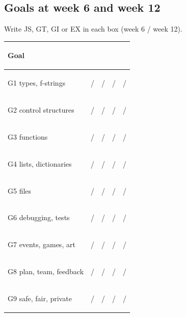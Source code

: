 \documentclass[level=2]{kidscode}
\begin{document}
\subsection{Goals at week 6 and week 12}
Write JS, GT, GI or EX in each box (week 6 / week 12).

{\small
\renewcommand{\arraystretch}{1.35}
\begin{tabularx}{\linewidth}{@{}>{\bfseries\raggedright\arraybackslash}p{4.6cm}*{4}{|X}@{}}
\toprule
Goal & & & & \\ \midrule
G1 types, f-strings & \quad / & \quad / & \quad / & \quad / \\ \midrule
G2 control structures & \quad / & \quad / & \quad / & \quad / \\ \midrule
G3 functions & \quad / & \quad / & \quad / & \quad / \\ \midrule
G4 lists, dictionaries & \quad / & \quad / & \quad / & \quad / \\ \midrule
G5 files & \quad / & \quad / & \quad / & \quad / \\ \midrule
G6 debugging, tests & \quad / & \quad / & \quad / & \quad / \\ \midrule
G7 events, games, art & \quad / & \quad / & \quad / & \quad / \\ \midrule
G8 plan, team, feedback & \quad / & \quad / & \quad / & \quad / \\ \midrule
G9 safe, fair, private & \quad / & \quad / & \quad / & \quad / \\
\bottomrule
\end{tabularx}}
\end{document}
